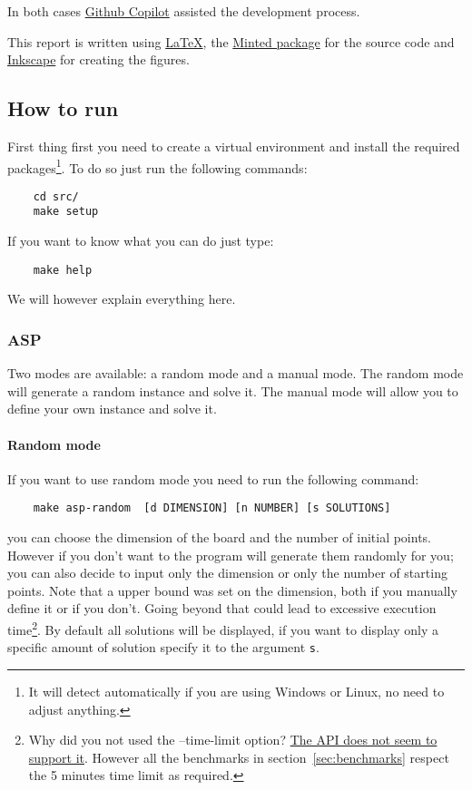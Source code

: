 In both cases \href{https://copilot.github.com/}{Github Copilot} assisted the development process.

This report is written using \href{https://www.latex-project.org/}{LaTeX}, the \href{https://ctan.org/pkg/minted?lang=en}{Minted package} for the source code and \href{https://inkscape.org/}{Inkscape} for creating the figures.


\subsection{How to run}
First thing first you need to create a virtual environment and install the required packages\footnote{It will detect automatically if you are using Windows or Linux, no need to adjust anything.}. To do so just run the following commands:
\begin{verbatim}
    cd src/
    make setup
\end{verbatim}

If you want to know what you can do just type:

\begin{verbatim}
    make help 
\end{verbatim}

We will however explain everything here.

\subsubsection{ASP}
Two modes are available: a random mode and a manual mode. The random mode will generate a random instance and solve it. The manual mode will allow you to define your own instance and solve it.

\paragraph{Random mode}

If you want to use random mode you need to run the following command:
\begin{verbatim}
    make asp-random  [d DIMENSION] [n NUMBER] [s SOLUTIONS]
\end{verbatim}

you can choose the dimension of the board and the number of initial points. However if you don't want to the program will generate them randomly for you; you can also decide to input only the dimension or only the number of starting points. Note that a upper bound was set on the dimension, both if you manually define it or if you don't. Going beyond that could lead to excessive execution time\footnote{Why did you not used the --time-limit option? \href{https://github.com/potassco/clingo/issues/151}{The API does not seem to support it}. However all the benchmarks in section~\ref{sec:benchmarks} respect the 5 minutes time limit as required.}.
By default all solutions will be displayed, if you want to display only a specific amount of solution specify it to the argument \texttt{s}. 

